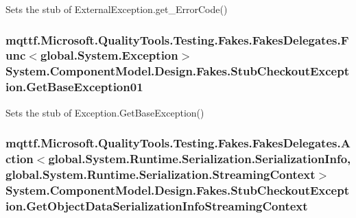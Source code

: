 Sets the stub of External\-Exception.\-get\-\_\-\-Error\-Code()

\hypertarget{class_system_1_1_component_model_1_1_design_1_1_fakes_1_1_stub_checkout_exception_a71af52786174a5b850d6245b5b4ec057}{
\subsubsection[{Get\-Base\-Exception01}]{\setlength{\rightskip}{0pt plus 5cm}mqttf.\-Microsoft.\-Quality\-Tools.\-Testing.\-Fakes.\-Fakes\-Delegates.\-Func$<$global.\-System.\-Exception$>$ System.\-Component\-Model.\-Design.\-Fakes.\-Stub\-Checkout\-Exception.\-Get\-Base\-Exception01}}\label{class_system_1_1_component_model_1_1_design_1_1_fakes_1_1_stub_checkout_exception_a71af52786174a5b850d6245b5b4ec057}


Sets the stub of Exception.\-Get\-Base\-Exception()

\hypertarget{class_system_1_1_component_model_1_1_design_1_1_fakes_1_1_stub_checkout_exception_a9571aa3e31a277450715ef785ccb7add}{
\subsubsection[{Get\-Object\-Data\-Serialization\-Info\-Streaming\-Context}]{\setlength{\rightskip}{0pt plus 5cm}mqttf.\-Microsoft.\-Quality\-Tools.\-Testing.\-Fakes.\-Fakes\-Delegates.\-Action$<$global.\-System.\-Runtime.\-Serialization.\-Serialization\-Info, global.\-System.\-Runtime.\-Serialization.\-Streaming\-Context$>$ System.\-Component\-Model.\-Design.\-Fakes.\-Stub\-Checkout\-Exception.\-Get\-Object\-Data\-Serialization\-Info\-Streaming\-Context}}\label{class_system_1_1_component_model_1_1_design_1_1_fakes_1_1_stub_checkout_exception_a9571aa3e31a277450715ef785ccb7add}


